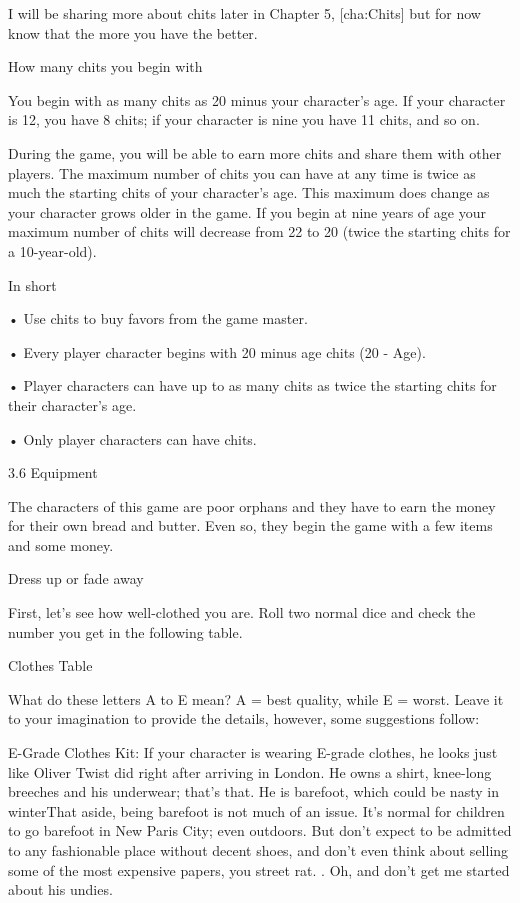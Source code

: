 I will be sharing more about chits later in Chapter 5, [cha:Chits] but for now know that the more you have the better.

How many chits you begin with

You begin with as many chits as 20 minus your character's age. If your character is 12, you have 8 chits; if your character is nine you have 11 chits, and so on. 

During the game, you will be able to earn more chits and share them with other players. The maximum number of chits you can have at any time is twice as much the starting chits of your character's age. This maximum does change as your character grows older in the game. If you begin at nine years of age your maximum number of chits will decrease from 22 to 20 (twice the starting chits for a 10-year-old).

In short

• Use chits to buy favors from the game master.

• Every player character begins with 20 minus age chits (20 - Age).

• Player characters can have up to as many chits as twice the starting chits for their character's age.

• Only player characters can have chits.

3.6 Equipment

The characters of this game are poor orphans and they have to earn the money for their own bread and butter. Even so, they begin the game with a few items and some money.

Dress up or fade away

First, let's see how well-clothed you are. Roll two normal dice and check the number you get in the following table. 

     Clothes Table      



          



What do these letters A to E mean? A = best quality, while E = worst. Leave it to your imagination to provide the details, however, some suggestions follow:

E-Grade Clothes Kit: If your character is wearing E-grade clothes, he looks just like Oliver Twist did right after arriving in London. He owns a shirt, knee-long breeches and his underwear; that's that. He is barefoot, which could be nasty in winterThat aside, being barefoot is not much of an issue. It's normal for children to go barefoot in New Paris City; even outdoors. But don't expect to be admitted to any fashionable place without decent shoes, and don't even think about selling some of the most expensive papers, you street rat. . Oh, and don't get me started about his undies. 

